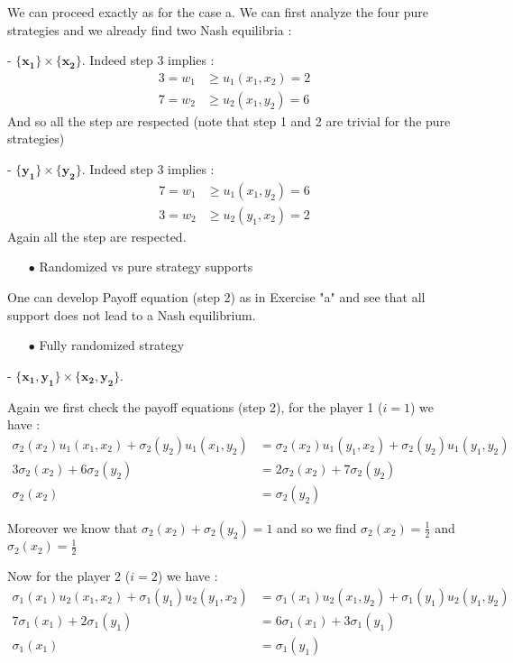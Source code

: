 We can proceed exactly as for the case a. We can first analyze the four pure strategies and we already find two Nash equilibria :

- $\mathbf{\{x_1\}}\times\mathbf{\{x_2\}}$. Indeed step 3 implies :
\begin{align*}
    3 =w_1&\ge u_1(x_1,x_2)=2 \\
    7=w_2&\ge u_2(x_1,y_2)=6 
\end{align*}
And so all the step are respected (note that step 1 and 2 are trivial for the pure strategies) 

- $\mathbf{\{y_1\}}\times\mathbf{\{y_2\}}$. Indeed step 3 implies :
\begin{align*}
    7 =w_1&\ge u_1(x_1,y_2)=6 \\
    3=w_2&\ge u_2(y_1,x_2)=2
\end{align*}
Again all the step are respected.


\begin{itemize}
  \item[$\bullet$] Randomized vs pure strategy supports
\end{itemize}

One can develop Payoff equation (step 2) as in Exercise "a" and see that all support does not lead to a Nash equilibrium.

\begin{itemize}
  \item[$\bullet$] Fully randomized strategy 
\end{itemize}
- $\mathbf{\{x_1,y_1\}}\times\mathbf{\{x_2,y_2\}}$.

Again we first check the payoff equations (step 2), for the player 1 ($i=1$) we have : 
\begin{align*}
 \sigma_2(x_2)u_1(x_1,x_2) + \sigma_2(y_2)u_1(x_1,y_2) &= \sigma_2(x_2)u_1(y_1,x_2) + \sigma_2(y_2)u_1(y_1,y_2) \\
 3\sigma_2(x_2)+6\sigma_2(y_2)&= 2\sigma_2(x_2) + 7\sigma_2(y_2) \\
 \sigma_2(x_2)&=\sigma_2(y_2)
\end{align*}

Moreover we know that $\sigma_2(x_2) + \sigma_2(y_2) = 1$ and so we find $\sigma_2(x_2)=\frac{1}{2}$ and $\sigma_2(x_2)=\frac{1}{2}$

Now for the player 2 ($i=2$) we have : 
\begin{align*}
 \sigma_1(x_1)u_2(x_1,x_2) + \sigma_1(y_1)u_2(y_1,x_2) &= \sigma_1(x_1)u_2(x_1,y_2) + \sigma_1(y_1)u_2(y_1,y_2) \\
 7\sigma_1(x_1)+2\sigma_1(y_1)&= 6\sigma_1(x_1) + 3\sigma_1(y_1) \\
 \sigma_1(x_1)&=\sigma_1(y_1)
\end{align*}

